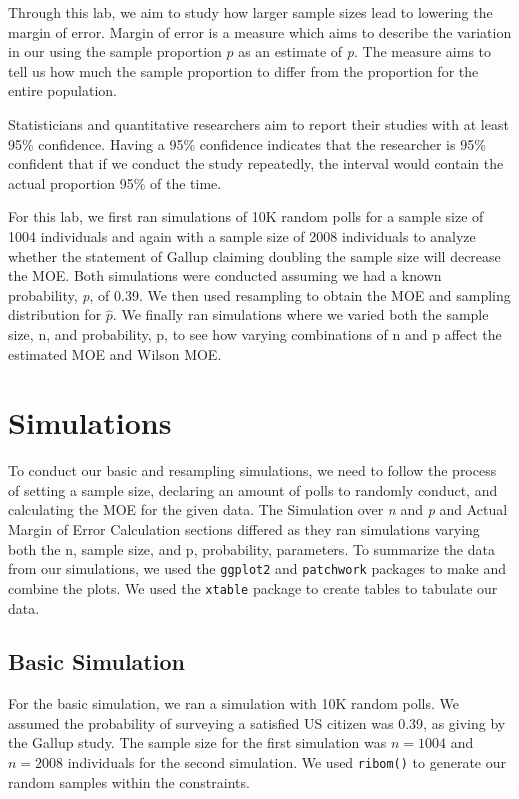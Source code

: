 \documentclass{article}\usepackage[]{graphicx}\usepackage[]{xcolor}
\begin{document}
\begin{multicols}{2}
Through this lab, we aim to study how larger sample sizes lead to lowering the margin of error. Margin of error is a measure which aims to describe the variation in our using the sample proportion $\hat{p}$ as an estimate of \textit{p}. The measure aims to tell us how much the sample proportion to differ from the proportion for the entire population.

Statisticians and quantitative researchers aim to report their studies with at least 95\% confidence. Having a 95\% confidence indicates that the researcher is 95\% confident that if we conduct the study repeatedly, the interval would contain the actual proportion 95\% of the time.

For this lab, we first ran simulations of 10K random polls for a sample size of 1004 individuals and again with a sample size of 2008 individuals to analyze whether the statement of Gallup claiming doubling the sample size will decrease the MOE. Both simulations were conducted assuming we had a known probability, \textit{p}, of 0.39. We then used resampling to obtain the MOE and sampling distribution for $\hat{p}$. We finally ran simulations where we varied both the sample size, n, and probability, p, to see how varying combinations of n and p affect the estimated MOE and Wilson MOE.

\section{Simulations}
To conduct our basic and resampling simulations, we need to follow the process of setting a sample size, declaring an amount of polls to randomly conduct, and calculating the MOE for the given data. The Simulation over \textit{n} and \textit{p} and Actual Margin of Error Calculation sections differed as they ran simulations varying both the n, sample size, and p, probability, parameters. To summarize the data from our simulations, we used the \texttt{ggplot2} \citep{ggplot2} and \texttt{patchwork} \citep{patchwork} packages to make and combine the plots. We used the \texttt{xtable} \citep{xtable} package to create tables to tabulate our data.

\subsection{Basic Simulation}
For the basic simulation, we ran a simulation with 10K random polls. We assumed the probability of surveying a satisfied US citizen was 0.39, as giving by the Gallup study. The sample size for the first simulation was $n = 1004$ and $n = 2008$ individuals for the second simulation. We used \texttt{ribom()} to generate our random samples within the constraints.


\end{multicols}
\end{document}
